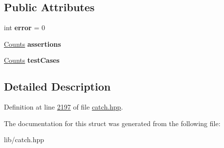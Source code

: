 \subsection*{Public Attributes}
\begin{DoxyCompactItemize}
\item 
\mbox{\label{structCatch_1_1Totals_a6ea14c7de7ea735a14f172a26e08a239}} 
int {\bfseries error} = 0
\item 
\mbox{\label{structCatch_1_1Totals_a885ded66df752147b30c3d45aa602ec9}} 
\mbox{\hyperlink{structCatch_1_1Counts}{Counts}} {\bfseries assertions}
\item 
\mbox{\label{structCatch_1_1Totals_adb195fe477aedee2ecea88c888f16506}} 
\mbox{\hyperlink{structCatch_1_1Counts}{Counts}} {\bfseries test\+Cases}
\end{DoxyCompactItemize}


\subsection{Detailed Description}


Definition at line \mbox{\hyperlink{catch_8hpp_source_l02197}{2197}} of file \mbox{\hyperlink{catch_8hpp_source}{catch.\+hpp}}.



The documentation for this struct was generated from the following file\+:\begin{DoxyCompactItemize}
\item 
lib/catch.\+hpp\end{DoxyCompactItemize}

